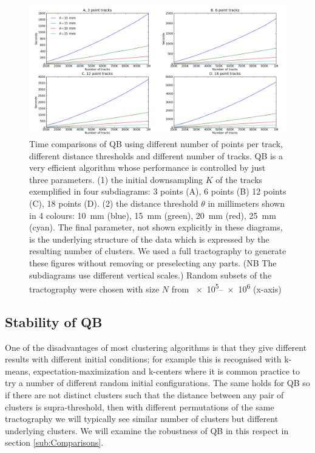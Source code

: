 \documentclass[preprint,authoryear,a4paper,10pt,onecolumn]{elsarticle}
\begin{document}
\begin{figure}
\noindent \begin{centering}
\includegraphics[scale=0.33]{2x2+leg-box}
\par\end{centering}
\caption{Time comparisons of QB using different number of points per
  track, different distance thresholds and different number of
  tracks. QB is a very efficient algorithm whose performance is
  controlled by just three parameters. (1) the initial downsampling $K$
  of the tracks exemplified in four subdiagrams: 3 points (A), 6 points
  (B) 12 points (C), 18 points (D). (2) the distance threshold $\theta$
  in millimeters shown in 4 colours: 10~mm (blue), 15~mm (green), 20~mm
  (red), 25~mm (cyan). The final parameter, not shown explicitly in
  these diagrams, is the underlying structure of the data which is
  expressed by the resulting number of clusters.  We used a full
  tractography to generate these figures without removing or
  preselecting any parts. (NB The subdiagrams use
  different vertical scales.) Random subsets of the tractography were
  chosen with size $N$ from \numrange{e5}{e6} (x-axis)\label{Flo:Speed1}}
\end{figure}

\subsection{Stability of QB\label{sub:Comparisons}}

One of the disadvantages of most clustering algorithms is that they give
different results with different initial conditions; for example this is
recognised with k-means, expectation-maximization
\citep{dempster1977maximum} and k-centers \citep{gonzalez1985clustering}
where it is common practice to try a number of different random initial
configurations. The same holds for QB so if there are not distinct
clusters such that the distance between any pair of clusters is
supra-threshold, then with different permutations of the same
tractography we will typically see similar number of clusters but
different underlying clusters. We will examine the robustness of QB in
this respect in section \ref{sub:Comparisons}.
\end{document}
